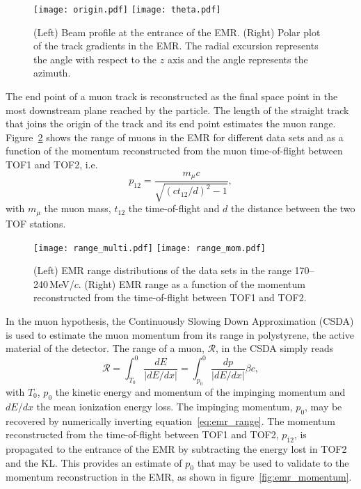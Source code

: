 \begin{figure}[htb!]
	\begin{center}
		\texttt{[image: origin.pdf]}
		\hfill
		\texttt{[image: theta.pdf]}
		\caption{(Left) Beam profile at the entrance of the EMR. (Right) Polar plot of the track gradients in the EMR. The radial excursion represents the angle with respect to the $z$ axis and the angle represents the azimuth.}
		\label{fig:emr_tracks}
	\end{center}
\end{figure}

The end point of a muon track is reconstructed as the final space point in the most downstream plane reached by the particle. The length of the straight track that joins the origin of the track and its end point estimates the muon range. Figure~\ref{fig:emr_range} shows the range of muons in the EMR for different data sets and as a function of the momentum reconstructed from the muon time-of-flight between TOF1 and TOF2, i.e.
\begin{equation}
p_{12} = \frac{m_\mu c}{\sqrt{\left(ct_{12}/d\right)^2-1}},
\end{equation}
with $m_\mu$ the muon mass, $t_{12}$ the time-of-flight and $d$ the distance between the two TOF stations.

\begin{figure}[htb!]
	\begin{center}
		\texttt{[image: range\_multi.pdf]}
		\hfill
		\texttt{[image: range\_mom.pdf]}
		\caption{(Left) EMR range distributions of the data sets in the range 170--240\,MeV/$c$. (Right) EMR range as a function of the momentum reconstructed from the time-of-flight between TOF1 and TOF2.}
		\label{fig:emr_range}
	\end{center}
\end{figure}

In the muon hypothesis, the Continuously Slowing Down Approximation (CSDA) is used to estimate the muon momentum from its range in polystyrene, the active material of the detector. The range of a muon, $\mathcal{R}$, in the CSDA simply reads
\begin{equation}
\mathcal{R} = \int_{T_0}^{0}\frac{dE}{|dE/dx|} = \int_{p_0}^{0}\frac{dp}{|dE/dx|} \beta c,
\label{eq:emr_range}
\end{equation}
with $T_0$, $p_0$ the kinetic energy and momentum of the impinging momentum and $dE/dx$ the mean ionization energy loss. The impinging momentum, $p_0$, may be recovered by numerically inverting equation~\ref{eq:emr_range}. The momentum reconstructed from the time-of-flight between TOF1 and TOF2, $p_{12}$, is propagated to the entrance of the EMR by subtracting the energy lost in TOF2 and the KL. This provides an estimate of $p_0$ that may be used to validate to the momentum reconstruction in the EMR, as shown in figure~\ref{fig:emr_momentum}. 

